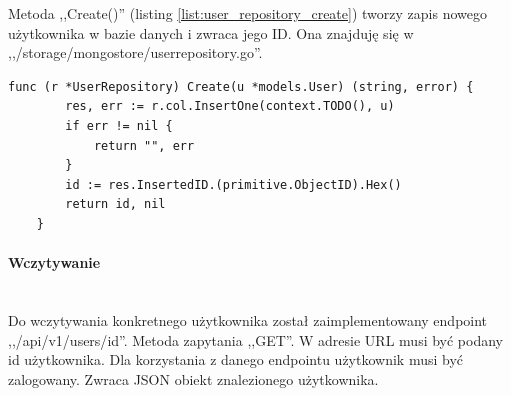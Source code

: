 Metoda ,,Create()'' (listing \ref{list:user_repository_create}) tworzy zapis nowego użytkownika w bazie danych i zwraca jego ID.
Ona znajduję się w ,,/storage/mongostore/userrepository.go''.
\begin{lstlisting}[label=list:user_repository_create,caption=Zachowanie użytkownika do bazy danych,basicstyle=\tiny\ttfamily]
    func (r *UserRepository) Create(u *models.User) (string, error) {
        res, err := r.col.InsertOne(context.TODO(), u)
        if err != nil {
            return "", err
        }
        id := res.InsertedID.(primitive.ObjectID).Hex()
        return id, nil
    }
\end{lstlisting}

% 
\paragraph{Wczytywanie}\mbox{}\\

Do wczytywania konkretnego użytkownika został zaimplementowany endpoint ,,/api/v1/users/{id}''.
Metoda zapytania ,,GET''.
W adresie URL musi być podany id użytkownika.
Dla korzystania z danego endpointu użytkownik musi być zalogowany.
Zwraca JSON obiekt znalezionego użytkownika.

